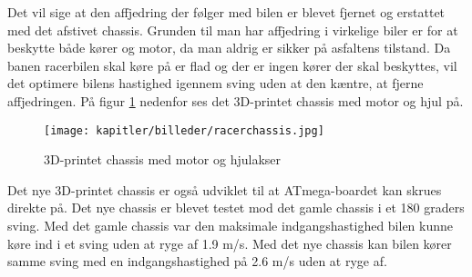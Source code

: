 Det vil sige at den affjedring der følger med bilen er blevet fjernet og erstattet med det afstivet chassis. Grunden til man har affjedring i virkelige biler er for at beskytte både kører og motor, da man aldrig er sikker på asfaltens tilstand. Da banen racerbilen skal køre på er flad og der er ingen kører der skal beskyttes, vil det optimere bilens hastighed igennem sving uden at den kæntre, at fjerne affjedringen. På figur \ref{fig:racerchassis} nedenfor ses det 3D-printet chassis med motor og hjul på.

\begin{figure}[ht]
    \centering
    \texttt{[image: kapitler/billeder/racerchassis.jpg]}
    \caption{3D-printet chassis med motor og hjulakser}
    \label{fig:racerchassis}
\end{figure}

Det nye 3D-printet chassis er også udviklet til at ATmega-boardet kan skrues direkte på. Det nye chassis er blevet testet mod det gamle chassis i et 180 graders sving. Med det gamle chassis var den maksimale indgangshastighed bilen kunne køre ind i et sving uden at ryge af 1.9 m/s. Med det nye chassis kan bilen kører samme sving med en indgangshastighed på 2.6 m/s uden at ryge af. 


